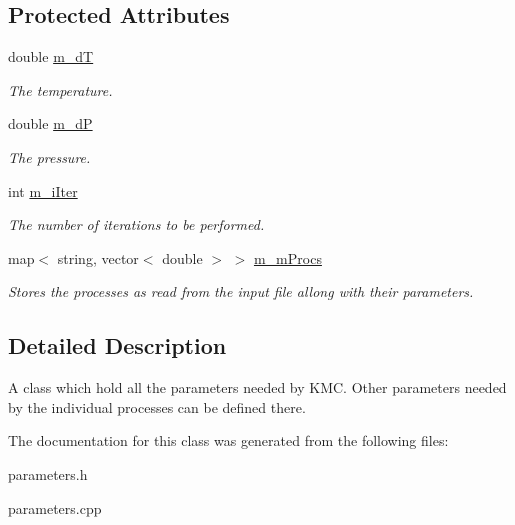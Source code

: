 \subsection*{Protected Attributes}
\begin{DoxyCompactItemize}
\item 
\mbox{\label{classUtils_1_1Parameters_ae876725df0b9ced07288603b77014fc5}} 
double \mbox{\hyperlink{classUtils_1_1Parameters_ae876725df0b9ced07288603b77014fc5}{m\+\_\+dT}}
\begin{DoxyCompactList}\small\item\em The temperature. \end{DoxyCompactList}\item 
\mbox{\label{classUtils_1_1Parameters_a464c3be85185b6eae1397e9dab04d295}} 
double \mbox{\hyperlink{classUtils_1_1Parameters_a464c3be85185b6eae1397e9dab04d295}{m\+\_\+dP}}
\begin{DoxyCompactList}\small\item\em The pressure. \end{DoxyCompactList}\item 
\mbox{\label{classUtils_1_1Parameters_a93a7064eaaa706a00ad584ccd6a984ba}} 
int \mbox{\hyperlink{classUtils_1_1Parameters_a93a7064eaaa706a00ad584ccd6a984ba}{m\+\_\+i\+Iter}}
\begin{DoxyCompactList}\small\item\em The number of iterations to be performed. \end{DoxyCompactList}\item 
\mbox{\label{classUtils_1_1Parameters_af280da145e43025392232ac12351a0f6}} 
map$<$ string, vector$<$ double $>$ $>$ \mbox{\hyperlink{classUtils_1_1Parameters_af280da145e43025392232ac12351a0f6}{m\+\_\+m\+Procs}}
\begin{DoxyCompactList}\small\item\em Stores the processes as read from the input file allong with their parameters. \end{DoxyCompactList}\end{DoxyCompactItemize}


\subsection{Detailed Description}
A class which hold all the parameters needed by K\+MC. Other parameters needed by the individual processes can be defined there. 

The documentation for this class was generated from the following files\+:\begin{DoxyCompactItemize}
\item 
parameters.\+h\item 
parameters.\+cpp\end{DoxyCompactItemize}
